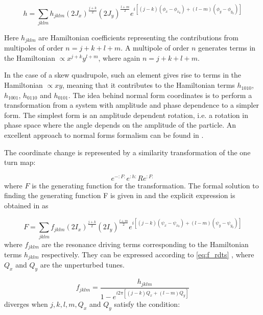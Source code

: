 \begin{equation}
    h = \sum_{j k l m} h_{j k l m} \left(2 J_{x}\right)^{\frac{j+k}{2}} \left(2 J_{y}\right)^{\frac{l+m}{2}} e^{i \left[(j-k)\left(\phi_{x}-\phi_{x_{0}}\right) + (l-m)\left(\phi_{y}-\phi_{y_{0}}\right) \right]}
    \label{eq:h_approximation_first_order}
\end{equation}

Here \(h_{j k l m}\) are Hamiltonian coefficients representing the contributions from multipoles of order \(n = j + k + l + m\).
A multipole of order \(n\) generates terms in the Hamiltonian \(\propto x^{j+k} y^{l+m}\), where again \(n = j + k + l + m\).

In the case of a skew quadrupole, such an element gives rise to terms in the Hamiltonian \(\propto xy\), meaning that it contributes to the Hamiltonian terms \(h_{1010}\), \(h_{1001}\), \(h_{0110}\) and \(h_{0101}\).
The idea behind normal form coordinates is to perform a transformation from a system with amplitude and phase dependence to a simpler form.
The simplest form is an amplitude dependent rotation, i.e. a rotation in phase space where the angle depends on the amplitude of the particle.
An excellent approach to normal forms formalism can be found in \cite{Carlier_thesis}.

The coordinate change is represented by a similarity transformation of the one turn map:

\begin{equation}
    e^{-: F:} e^{: h:} R e^{: F:}
\end{equation}
where \(F\) is the generating function for the transformation.
The formal solution to finding the generating function F is given in \cite{Forest_normal_forms} and the explicit expression is obtained in \cite{Tomas_thesis} as

\begin{equation}
    F = \sum_{j k l m} f_{j k l m} \left(2 I_{x}\right)^{\frac{j+k}{2}}\left(2 I_{y}\right)^{\frac{l+m}{2}} e^{i\left[(j-k)\left(\psi_{x}-\psi_{x_{0}}\right)+(l-m)\left(\psi_{y}-\psi_{y_{0}}\right)\right]}
    \label{eq:F_generating}
\end{equation}
where \(f_{jklm}\) are the resonance driving terms corresponding to the Hamiltonian terms \(h_{jklm}\) respectively.
They can be expressed according to \cref{eq:f_rdts} \cite{Tomas_thesis, Franchi_thesis}, where \(Q_x\) and \(Q_y\) are the unperturbed tunes.

\begin{equation}
    f_{jklm} = \frac{h_{jklm}}{1 - e^{i 2 \pi \left[(j-k) Q_{x} + (l-m) Q_{y} \right]}}
    \label{eq:f_rdts}
\end{equation}
 diverges when \(j, k, l, m, Q_x\) and \(Q_y\) satisfy the condition:

